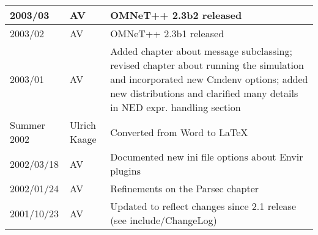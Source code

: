 \begin{longtable}{|l|p{1cm}|p{10cm}|}
2003/03 & AV & OMNeT++ 2.3b2 released\\\hline
2003/02 & AV & OMNeT++ 2.3b1 released\\\hline
2003/01 & AV & Added chapter about message subclassing; revised chapter about
               running the simulation and incorporated new Cmdenv options; added new
               distributions and clarified many details in NED expr. handling section\\\hline
Summer 2002 & Ulrich Kaage & Converted from Word to LaTeX\\\hline
2002/03/18 & AV & Documented new ini file options about Envir plugins\\\hline
2002/01/24 & AV & Refinements on the Parsec chapter\\\hline
2001/10/23 & AV & Updated to reflect changes since 2.1 release (see include/ChangeLog)\\\hline
\end{longtable}




